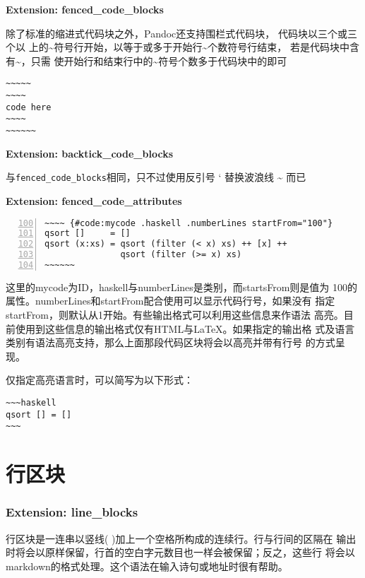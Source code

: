 \documentclass[fancyhdr,bookmark]{ctexbook}
\begin{document}
\textbf{Extension: fenced\_code\_blocks}

除了标准的缩进式代码块之外，Pandoc还支持围栏式代码块，
代码块以三个或三个以
上的\textasciitilde{}符号行开始，以等于或多于开始行\textasciitilde{}个数符号行结束，
若是代码块中含有\textasciitilde{}，只需
使开始行和结束行中的\textasciitilde{}符号个数多于代码块中的即可

\begin{lstlisting}
~~~~~
~~~~
code here
~~~~
~~~~~~
\end{lstlisting}

\textbf{Extension: backtick\_code\_blocks}

与\lstinline!fenced_code_blocks!相同，只不过使用反引号 ` 替换波浪线
\textasciitilde{} 而已

\textbf{Extension: fenced\_code\_attributes}

\begin{lstlisting}[numbers=left, firstnumber=100, label=code:fencedcode, caption=code:fencedcode, float=htbp]
~~~~ {#code:mycode .haskell .numberLines startFrom="100"}
qsort []     = []
qsort (x:xs) = qsort (filter (< x) xs) ++ [x] ++
               qsort (filter (>= x) xs)
~~~~~~
\end{lstlisting}

这里的mycode为ID，haskell与numberLines是类别，而startsFrom则是值为
100的属性。numberLines和startFrom配合使用可以显示代码行号，如果没有
指定startFrom，则默认从1开始。有些输出格式可以利用这些信息来作语法
高亮。目前使用到这些信息的输出格式仅有HTML与LaTeX。如果指定的输出格
式及语言类别有语法高亮支持，那么上面那段代码区块将会以高亮并带有行号
的方式呈现。

仅指定高亮语言时，可以简写为以下形式：

\begin{lstlisting}
~~~haskell
qsort [] = []
~~~
\end{lstlisting}

\section{行区块}\label{ux884cux533aux5757}

\subsubsection{Extension: line\_blocks}\label{extension-lineux5fblocks}

行区块是一连串以竖线(
\textbar{})加上一个空格所构成的连续行。行与行间的区隔在
输出时将会以原样保留，行首的空白字元数目也一样会被保留；反之，这些行
将会以markdown的格式处理。这个语法在输入诗句或地址时很有帮助。
\end{document}
